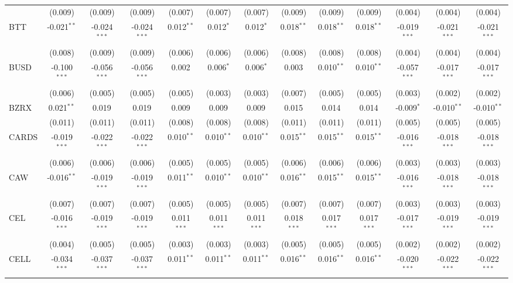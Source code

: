 \begin{table}[!htbp]
\begin{tabular}{@{\extracolsep{5pt}}lcccccccccccc}
  & (0.009) & (0.009) & (0.009) & (0.007) & (0.007) & (0.007) & (0.009) & (0.009) & (0.009) & (0.004) & (0.004) & (0.004) \\
 BTT & -0.021$^{**}$ & -0.024$^{***}$ & -0.024$^{***}$ & 0.012$^{**}$ & 0.012$^{*}$ & 0.012$^{*}$ & 0.018$^{**}$ & 0.018$^{**}$ & 0.018$^{**}$ & -0.019$^{***}$ & -0.021$^{***}$ & -0.021$^{***}$ \\
  & (0.008) & (0.009) & (0.009) & (0.006) & (0.006) & (0.006) & (0.008) & (0.008) & (0.008) & (0.004) & (0.004) & (0.004) \\
 BUSD & -0.100$^{***}$ & -0.056$^{***}$ & -0.056$^{***}$ & 0.002$^{}$ & 0.006$^{*}$ & 0.006$^{*}$ & 0.003$^{}$ & 0.010$^{**}$ & 0.010$^{**}$ & -0.057$^{***}$ & -0.017$^{***}$ & -0.017$^{***}$ \\
  & (0.006) & (0.005) & (0.005) & (0.005) & (0.003) & (0.003) & (0.007) & (0.005) & (0.005) & (0.003) & (0.002) & (0.002) \\
 BZRX & 0.021$^{**}$ & 0.019$^{}$ & 0.019$^{}$ & 0.009$^{}$ & 0.009$^{}$ & 0.009$^{}$ & 0.015$^{}$ & 0.014$^{}$ & 0.014$^{}$ & -0.009$^{*}$ & -0.010$^{**}$ & -0.010$^{**}$ \\
  & (0.011) & (0.011) & (0.011) & (0.008) & (0.008) & (0.008) & (0.011) & (0.011) & (0.011) & (0.005) & (0.005) & (0.005) \\
 CARDS & -0.019$^{***}$ & -0.022$^{***}$ & -0.022$^{***}$ & 0.010$^{**}$ & 0.010$^{**}$ & 0.010$^{**}$ & 0.015$^{**}$ & 0.015$^{**}$ & 0.015$^{**}$ & -0.016$^{***}$ & -0.018$^{***}$ & -0.018$^{***}$ \\
  & (0.006) & (0.006) & (0.006) & (0.005) & (0.005) & (0.005) & (0.006) & (0.006) & (0.006) & (0.003) & (0.003) & (0.003) \\
 CAW & -0.016$^{**}$ & -0.019$^{***}$ & -0.019$^{***}$ & 0.011$^{**}$ & 0.010$^{**}$ & 0.010$^{**}$ & 0.016$^{**}$ & 0.015$^{**}$ & 0.015$^{**}$ & -0.016$^{***}$ & -0.018$^{***}$ & -0.018$^{***}$ \\
  & (0.007) & (0.007) & (0.007) & (0.005) & (0.005) & (0.005) & (0.007) & (0.007) & (0.007) & (0.003) & (0.003) & (0.003) \\
 CEL & -0.016$^{***}$ & -0.019$^{***}$ & -0.019$^{***}$ & 0.011$^{***}$ & 0.011$^{***}$ & 0.011$^{***}$ & 0.018$^{***}$ & 0.017$^{***}$ & 0.017$^{***}$ & -0.017$^{***}$ & -0.019$^{***}$ & -0.019$^{***}$ \\
  & (0.004) & (0.005) & (0.005) & (0.003) & (0.003) & (0.003) & (0.005) & (0.005) & (0.005) & (0.002) & (0.002) & (0.002) \\
 CELL & -0.034$^{***}$ & -0.037$^{***}$ & -0.037$^{***}$ & 0.011$^{**}$ & 0.011$^{**}$ & 0.011$^{**}$ & 0.016$^{**}$ & 0.016$^{**}$ & 0.016$^{**}$ & -0.020$^{***}$ & -0.022$^{***}$ & -0.022$^{***}$ \\

\end{tabular}
\end{table}
